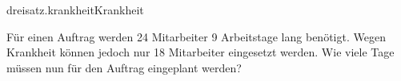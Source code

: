 \begin{exercise}{dreisatz.krankheit}{Krankheit}
  \ifproblem\problem\par
    Für einen Auftrag werden 24 Mitarbeiter 9 Arbeitstage lang benötigt. Wegen
    Krankheit können jedoch nur 18 Mitarbeiter eingesetzt werden. Wie viele
    Tage müssen nun für den Auftrag eingeplant werden?
  \fi
\end{exercise}
